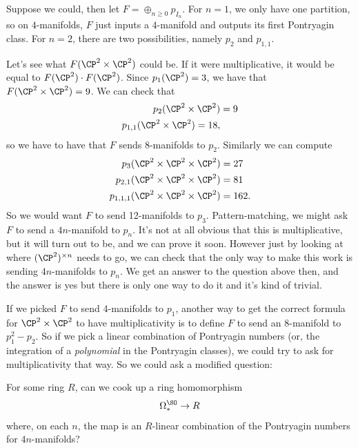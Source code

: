 \documentclass[11pt]{book}
\begin{document}
Suppose we could, then let $F = \oplus_{n\ge0} p_{I_n}$. For $n=1$, we only have one partition, so on $4$-manifolds, $F$ just inputs a $4$-manifold and outputs its first Pontryagin class. For $n=2$, there are two possibilities, namely $p_2$ and $p_{1,1}$.

Let's see what $F(\CP^2 \times \CP^2)$ could be. If it were multiplicative, it would be equal to $F(\CP^2) \cdot F(\CP^2)$. Since $p_1(\CP^2) = 3$, we have that $F(\CP^2 \times \CP^2) = 9$. We can check that
\begin{align*}
    p_{2}(\CP^2 \times \CP^2) &= 9 \\
    p_{1,1} (\CP^2 \times \CP^2) = 18,
\end{align*}
so we have to have that $F$ sends $8$-manifolds to $p_2$. Similarly we can compute
\begin{align*}
    p_3(\CP^2 \times \CP^2 \times \CP^2) &= 27 \\
    p_{2,1}(\CP^2 \times \CP^2 \times \CP^2) &= 81 \\
    p_{1,1,1}(\CP^2 \times \CP^2 \times\CP^2) &= 162.
\end{align*}
So we would want $F$ to send 12-manifolds to $p_3$. Pattern-matching, we might ask $F$ to send a $4n$-manifold to $p_n$. It's not at all obvious that this is multiplicative, but it will turn out to be, and we can prove it soon. However just by looking at where $(\CP^2)^{\times n}$ needs to go, we can check that the only way to make this work is sending $4n$-manifolds to $p_n$. We get an answer to the question above then, and the answer is yes but there is only one way to do it and it's kind of trivial.

If we picked $F$ to send 4-manifolds to $p_1$, another way to get the correct formula for $\CP^2 \times \CP^2$ to have multiplicativity is to define $F$ to send an 8-manifold to $p_1^2 - p_2$. So if we pick a linear combination of Pontryagin numbers (or, the integration of a \emph{polynomial} in the Pontryagin classes), we could try to ask for multiplicativity that way. So we could ask a modified question:

\begin{question} For some ring $R$, can we cook up a ring homomorphism
\begin{align*}
    \Omega_\ast^\SO \to R
\end{align*}
where, on each $n$, the map is an $R$-linear combination of the Pontryagin numbers for $4n$-manifolds?
\end{question}
\end{document}
